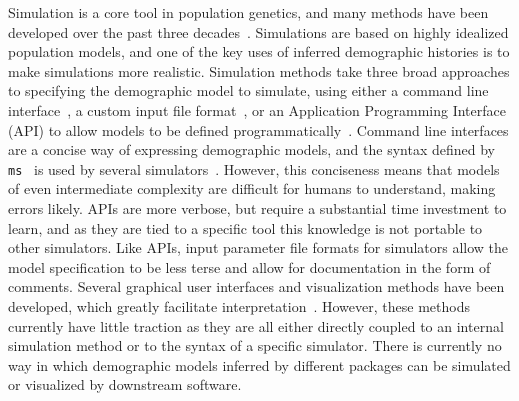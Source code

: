 \documentclass[11pt]{article}
\newcommand{\ms}[0]{\texttt{ms}}
\begin{document}
Simulation is a core tool in population genetics, and
many methods have been developed over the past three
decades~\citep{carvajal2008simulation,liu2008survey,
arenas2012simulation,yuan2012overview,hoban2012computer}.
Simulations are based on highly idealized population models,
and one of the key uses of inferred demographic histories
is to make simulations more realistic.
Simulation methods take three broad approaches to specifying
the demographic model to simulate,
using either a command line
interface~\citep[e.g.,][]{hudson2002generating,hernandez_flexible_2008,kern2016discoal},
a custom input file
format~\citep[e.g.,][]{guillaume2006nemo,excoffier2011fastsimcoal,shlyakhter2014cosi2},
or an Application Programming Interface (API) to allow
models to be defined programmatically~\citep[e.g.,][]{
thornton2014cpp,hernandez_sfs_code_2015,kelleher2016efficient,
becheler2019quetzal,haller2019slim,thornton2019-nu,baumdicker2021-iu}.
Command line interfaces are a concise way of expressing
demographic models, and the syntax defined by \ms~\citep{hudson2002generating}
is used by several
simulators~\citep[e.g.,][]{ewing2010msms,chen2009fast,staab2015scrm}.
However, this conciseness means that models of even intermediate complexity
are difficult for humans to understand, making errors likely.
APIs are more verbose, but require a substantial time investment to
learn, and as they are tied to a specific tool this knowledge is not portable
to other simulators.
Like APIs, input parameter file formats for simulators allow the model specification
to be less terse and allow for documentation in the form of comments.
Several graphical user interfaces  and visualization
methods have been developed, which greatly facilitate
interpretation~\citep{mailund2005coasim,antao2007modeler4simcoal2,
parreira_spams_2009,ewing2010msms,parobek_skelesim_2017,zhou2018popdemog}.
However, these methods
currently have little traction as they are all either directly coupled
to an internal simulation method or to the syntax of a specific simulator.
There is currently no way in which demographic models inferred by
different packages can be simulated or visualized by downstream software.
\end{document}
